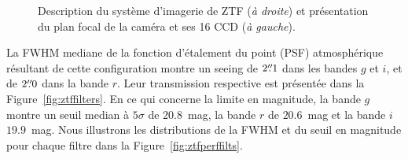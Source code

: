 \documentclass[../main/main.tex]{subfiles}
\begin{document}
\begin{figure}[ht]
\centering
{}\hfill
{}
\caption[Système d'imagerie ZTF et caméra]{Description du système d'imagerie de ZTF (\textit{à droite}) et présentation du
  plan focal de la caméra et ses 16 CCD (\textit{à gauche}). }
\label{fig:imageriecamztf}
\end{figure}


La FWHM mediane de la fonction d'étalement du point
(PSF) atmosphérique résultant de cette configuration montre un seeing de $2\overset{\prime\prime}{.}1$ dans les bandes
$g$ et $i$, et de $2\overset{\prime\prime}{.}0$ dans la bande $r$. Leur transmission
respective est présentée dans la Figure~\ref{fig:ztffilters}. En ce qui concerne la limite en magnitude, la bande $g$ montre un seuil median à
$5\sigma$ de $20.8$~mag, la bande $r$ de $20.6$~mag et la bande $i$
$19.9$~mag. Nous illustrons les distributions de la FWHM et du seuil en
magnitude pour chaque filtre dans la Figure~\ref{fig:ztfperffilts}. 
\end{document}
